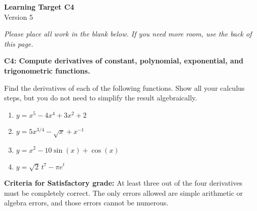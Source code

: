 \documentclass[10pt]{article}
\begin{document}
	\vspace*{0in}

		\begin{center}
			\textbf{Learning Target C4} \\
			{Version 5} \\
		\end{center}

\emph{Please place all work in the blank below. If you need more room, use the back of this page.}

\begin{framed}
	\textbf{C4: Compute derivatives of constant, polynomial, exponential, and trigonometric functions.}
\end{framed}

Find the derivatives of each of the following functions. Show all your calculus steps, but you do not need to simplify the result algebraically. 

\begin{enumerate}
    \item $y = x^5 - 4x^4 + 3x^2 + 2$
    \item $y = 5x^{3/4} - \sqrt{x} + x^{-1}$
    \item $y = x^2 - 10 \sin(x) + \cos(x)$
    \item $y = \sqrt{2} \, t^7 - \pi e^t$
\end{enumerate}

\vfill


\begin{small}
    \begin{framed}
        	\textbf{Criteria for Satisfactory grade:} At least three out of the four derivatives must be completely correct. The only errors allowed are simple arithmetic or algebra errors, and those errors cannot be numerous.
    \end{framed}

\end{small}
\end{document}
